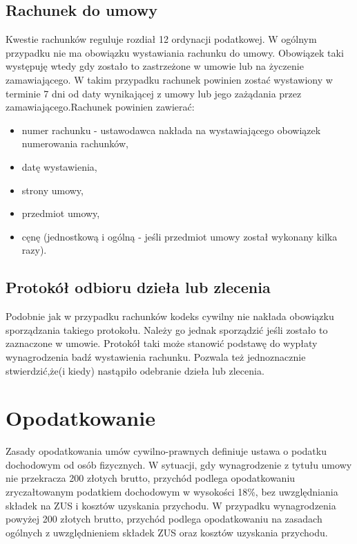 \subsection[Rachunek do umowy][Rachunek do umowy]{Rachunek do umowy}
Kwestie rachunków reguluje rozdiał 12 ordynacji podatkowej\cite{TODO}. W ogólnym przypadku nie ma obowiązku wystawiania rachunku do umowy. Obowiązek taki występuję wtedy gdy zostało to zastrzeżone w umowie lub na życzenie zamawiającego. W takim przypadku rachunek powinien zostać wystawiony w terminie 7 dni od daty wynikającej z umowy lub jego zażądania przez zamawiającego.Rachunek powinien zawierać:
\begin{itemize}
\item numer rachunku - ustawodawca nakłada na wystawiającego obowiązek numerowania rachunków,
\item datę wystawienia,
\item strony umowy,
\item przedmiot umowy,
\item cęnę (jednostkową i ogólną - jeśli przedmiot umowy został wykonany kilka razy).
\end{itemize}

\subsection[Protokół odbioru dzieła lub zlecenia][Protokół odbioru dzieła lub zlecenia]{Protokół odbioru dzieła lub zlecenia}
Podobnie jak w przypadku rachunków kodeks cywilny nie nakłada obowiązku sporządzania takiego protokołu. Należy go jednak sporządzić jeśli zostało to zaznaczone w umowie. Protokół taki może stanowić podstawę do wypłaty wynagrodzenia badź wystawienia rachunku. Pozwala też jednoznacznie stwierdzić,że(i kiedy) nastąpiło odebranie dzieła lub zlecenia.

\section[Opodatkowanie][Opodatkowanie]{Opodatkowanie}
Zasady opodatkowania umów cywilno-prawnych definiuje ustawa o podatku dochodowym od osób fizycznych\cite{TODO}. W sytuacji, gdy wynagrodzenie z tytułu umowy nie przekracza 200 złotych brutto, przychód podlega opodatkowaniu zryczałtowanym podatkiem dochodowym w wysokości 18\%, bez uwzględniania składek na ZUS i kosztów uzyskania przychodu.
W przypadku wynagrodzenia powyżej 200 złotych brutto, przychód podlega opodatkowaniu na zasadach ogólnych z uwzględnieniem składek ZUS oraz kosztów uzyskania przychodu.

